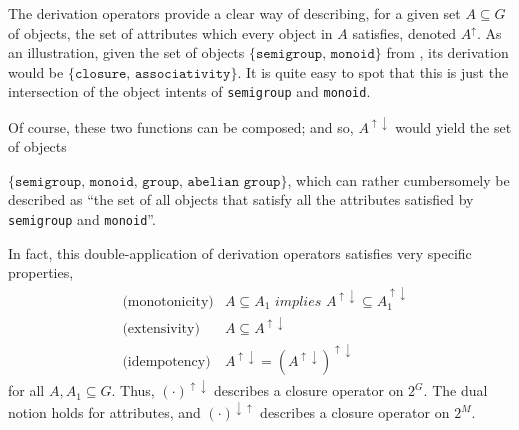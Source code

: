 The derivation operators provide a clear way of describing, for a given set $A\subseteq G$ of objects, the set of attributes which every object in $A$ satisfies, denoted $A^\uparrow$. As an illustration, given the set of objects $\{\texttt{semigroup, monoid}\}$ from , its derivation would be $\{\texttt{closure, associativity}\}$. It is quite easy to spot that this is just the intersection of the object intents of \texttt{semigroup} and \texttt{monoid}.

Of course, these two functions can be composed; and so, $A^{\uparrow \downarrow}$ would yield the set of objects

$\{\texttt{semigroup, monoid, group, abelian group}\}$, which can rather cumbersomely be described as ``the set of all  objects that satisfy all the attributes satisfied by \texttt{semigroup} and \texttt{monoid}''.


In fact, this double-application of derivation operators satisfies very specific properties,
\begin{align}
  & \text{(monotonicity)} & A \subseteq A_1 \textit{ implies } A^{\uparrow \downarrow} \subseteq A_1^{\uparrow \downarrow} \\
  & \text{(extensivity)}  & A \subseteq A^{\uparrow \downarrow} \\
  & \text{(idempotency)}  & A^{\uparrow \downarrow} = (A^{\uparrow \downarrow})^{\uparrow \downarrow}
\end{align}
for all $A, A_1 \subseteq G$. Thus, $(\cdot)^{\uparrow \downarrow}$ describes a closure operator on $2^G$. The dual notion holds for attributes, and $(\cdot)^{\downarrow \uparrow}$ describes a closure operator on $2^M$.


